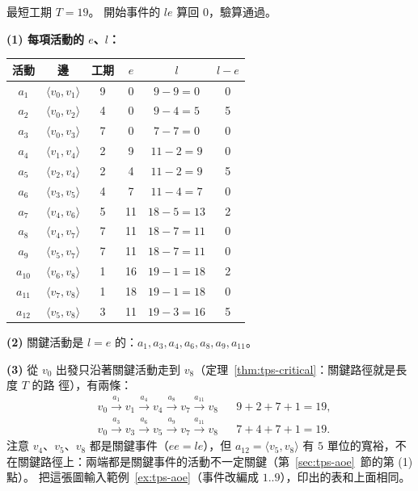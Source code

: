 最短工期 $T = 19$。 開始事件的 $\mathit{le}$ 算回 $0$，驗算通過。

\textbf{(1) 每項活動的 $e$、$l$：}

\begin{center}
\small
\begin{tabular}{cccccc}
\toprule
活動 & 邊 & 工期 & $e$ & $l$ & $l - e$ \\
\midrule
$a_1$ & $\langle v_0, v_1 \rangle$ & 9 & 0 & $9 - 9 = 0$ & 0 \\
$a_2$ & $\langle v_0, v_2 \rangle$ & 4 & 0 & $9 - 4 = 5$ & 5 \\
$a_3$ & $\langle v_0, v_3 \rangle$ & 7 & 0 & $7 - 7 = 0$ & 0 \\
$a_4$ & $\langle v_1, v_4 \rangle$ & 2 & 9 & $11 - 2 = 9$ & 0 \\
$a_5$ & $\langle v_2, v_4 \rangle$ & 2 & 4 & $11 - 2 = 9$ & 5 \\
$a_6$ & $\langle v_3, v_5 \rangle$ & 4 & 7 & $11 - 4 = 7$ & 0 \\
$a_7$ & $\langle v_4, v_6 \rangle$ & 5 & 11 & $18 - 5 = 13$ & 2 \\
$a_8$ & $\langle v_4, v_7 \rangle$ & 7 & 11 & $18 - 7 = 11$ & 0 \\
$a_9$ & $\langle v_5, v_7 \rangle$ & 7 & 11 & $18 - 7 = 11$ & 0 \\
$a_{10}$ & $\langle v_6, v_8 \rangle$ & 1 & 16 & $19 - 1 = 18$ & 2 \\
$a_{11}$ & $\langle v_7, v_8 \rangle$ & 1 & 18 & $19 - 1 = 18$ & 0 \\
$a_{12}$ & $\langle v_5, v_8 \rangle$ & 3 & 11 & $19 - 3 = 16$ & 5 \\
\bottomrule
\end{tabular}
\end{center}

\textbf{(2)} 關鍵活動是 $l = e$ 的：$a_1, a_3, a_4, a_6, a_8, a_9, a_{11}$。

\textbf{(3)} 從 $v_0$ 出發只沿著關鍵活動走到 $v_8$（定理~\ref{thm:tps-critical}：關鍵路徑就是長度 $T$ 的路
徑），有兩條：
\begin{align*}
&v_0 \xrightarrow{a_1} v_1 \xrightarrow{a_4} v_4 \xrightarrow{a_8} v_7 \xrightarrow{a_{11}} v_8
&& 9 + 2 + 7 + 1 = 19, \\
&v_0 \xrightarrow{a_3} v_3 \xrightarrow{a_6} v_5 \xrightarrow{a_9} v_7 \xrightarrow{a_{11}} v_8
&& 7 + 4 + 7 + 1 = 19.
\end{align*}
注意 $v_4$、$v_5$、$v_8$ 都是關鍵事件（$\mathit{ee} = \mathit{le}$），但 $a_{12} = \langle v_5, v_8 \rangle$ 有
$5$ 單位的寬裕，不在關鍵路徑上：兩端都是關鍵事件的活動不一定關鍵（第~\ref{sec:tps-aoe}~節的第 (1) 點）。
把這張圖輸入範例~\ref{ex:tps-aoe}（事件改編成 $1..9$），印出的表和上面相同。

